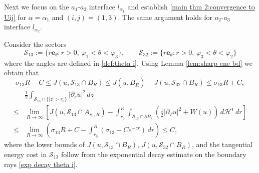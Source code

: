 \documentclass[leqno,11pt]{amsart}
\let\pa=\partial
\let\al=\alpha
\let\f=\frac
\let\pa=\partial
\theoremstyle{remark}
\newcommand{\ch}{\mathcal{H}^1}
\begin{document}
Next we focus on the $a_1$-$a_3$ interface $l_{\al_1}$ and establish \eqref{main thm 2:convergence to Uij} for $\al=\al_1$ and $(i,j)=(1,3)$. The same argument holds for $a_2$-$a_3$ interface $l_{\al_2}$. 

Consider the sectors
\begin{equation*}
    \mathcal{S}_{13}:= \{r\mathbf{e}_\theta: r>0,\,\varphi_1<\theta<\varphi_3\},\qquad \mathcal{S}_{32}:= \{r\mathbf{e}_\theta: r>0,\,\varphi_3<\theta<\varphi_2\}
\end{equation*}
where the angles are defined in \eqref{def:theta i}. Using Lemma \ref{lem:sharp ene bd} we obtain that 
\begin{equation}
    \label{ene bd S13} \sigma_{13}R-C\leq J(u,\mathcal{S}_{13}\cap B_R)\leq J(u,B_R^+)-J(u,\mathcal{S}_{32}\cap B_R)\leq \sigma_{13}R+C,
\end{equation}
\begin{equation}\label{est: dr S13}
\begin{split}
&\f12\int_{\mathcal{S}_{13}\cap \{|z|>r_0\}}|\pa_ru|^2\,dz \\
\leq &\lim_{R\to\infty}\left[J(u,\mathcal{S}_{13}\cap A_{r_0,R})-\int_{r_0}^R \int_{\mathcal{S}_{13}\cap\pa B_r}\left( \f12|\pa_T u|^2+W(u) \right)\,d\ch\,dr\right]\\
\leq &\lim_{R\to\infty}(\sigma_{13}R+C-\int_{r_0}^R(\sigma_{13}-Ce^{-cr})\,dr)\leq C,
\end{split}
\end{equation}
where the lower bounds of $J(u,\mathcal{S}_{13}\cap B_R)$, $J(u,\mathcal{S}_{32}\cap B_R)$, and the tangential energy cost in $\mathcal{S}_{13}$ follow from the exponential decay estimate on the boundary rays \eqref{exp decay theta i}.
\end{document}
